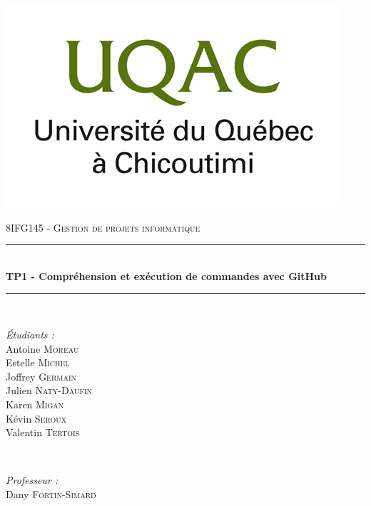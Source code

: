 \documentclass[11pt,canadien]{article}
\begin{document}
\begin{titlepage}

\newcommand{\HRule}{\rule{\linewidth}{0.5mm}} %

\center %
 

\includegraphics[width=\textwidth]{images/uqac_logo.jpg} %
 
\textsc{\LARGE 8IFG145 - Gestion de projets informatique}\\[0.5cm]


\HRule \\[0.4cm]
{ \huge \bfseries TP1 - Compréhension et exécution de commandes avec GitHub}\\[0.4cm]
\HRule \\[0.5cm]
 

\begin{minipage}{0.4\textwidth}
\begin{flushleft} \large
\emph{Étudiants :}\\
Antoine \textsc{Moreau}\\
Estelle \textsc{Michel}\\
Joffrey \textsc{Germain}\\
Julien \textsc{Naty-Daufin}\\
Karen \textsc{Migan}\\
Kévin \textsc{Seroux}\\
Valentin \textsc{Tertois}\\
\end{flushleft}
\end{minipage}
~
\begin{minipage}{0.4\textwidth}
\begin{flushright} \large
\emph{Professeur :}\\
Dany \textsc{Fortin-Simard}
\end{flushright}
\end{minipage}\\[2cm]


\end{titlepage}
\end{document}
